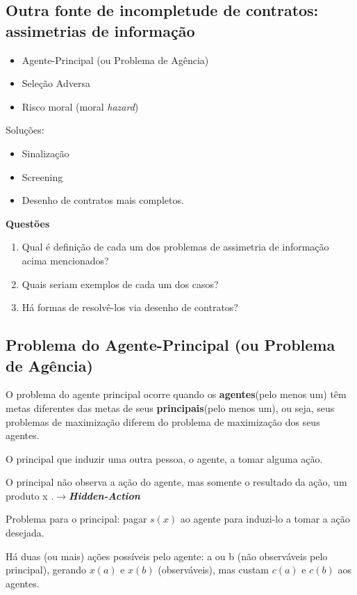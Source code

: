 \documentclass[a4paper,12pt]{article}[abntex2]
\begin{document}
\subsection{\textbf{Outra fonte de incompletude de contratos: assimetrias de informação}}
\begin{itemize}
    \item Agente-Principal (ou Problema de Agência)
    \item Seleção Adversa
    \item Risco moral (moral \textit{hazard})
\end{itemize}

Soluções:\begin{itemize}
    \item Sinalização 
    \item Screening
    \item Desenho de contratos mais completos. 
\end{itemize}

\textbf{Questões}\begin{enumerate}
    \item Qual é definição de cada um dos problemas de assimetria de informação acima mencionados?
    \item Quais seriam exemplos de cada um dos casos?
    \item Há formas de resolvê-los via desenho de contratos?
\end{enumerate}

\subsection{\textbf{Problema do Agente-Principal (ou Problema de Agência)}}
O problema do agente principal ocorre quando os \textbf{agentes}(pelo menos um) têm metas diferentes das metas de seus \textbf{principais}(pelo menos um), ou seja, seus problemas de maximização diferem do problema de maximização dos seus agentes.

O principal que induzir uma outra pessoa, o agente, a tomar alguma ação. 

O principal não observa a ação do agente, mas somente o resultado da ação, um produto x .\(\rightarrow\)\textbf{\textit{Hidden-Action}}

Problema para o principal: pagar \(s(x)\) ao agente para induzi-lo a tomar a ação desejada.

Há duas (ou mais) ações possíveis pelo agente: a ou b (não observáveis pelo principal), gerando \(x(a)\) e \(x(b)\) (observáveis), mas custam \(c(a)\) e \(c(b)\) aos agentes.
\end{document}
